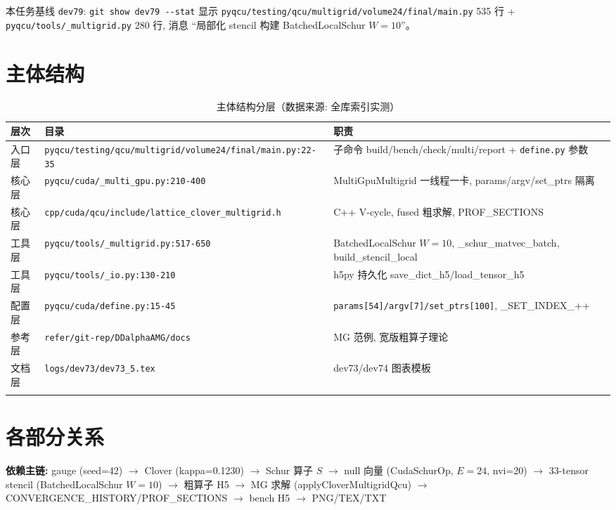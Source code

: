 \documentclass[UTF8]{ctexart}
\begin{document}
\noindent 本任务基线 \texttt{\nolinkurl{dev79}}: \texttt{\nolinkurl{git show dev79 --stat}} 显示 \texttt{\nolinkurl{pyqcu/testing/qcu/multigrid/volume24/final/main.py}} 535 行 + \texttt{\nolinkurl{pyqcu/tools/_multigrid.py}} 280 行, 消息 ``局部化 stencil 构建 BatchedLocalSchur $W=10$''。

\section{主体结构}
\begin{xltabular}{\textwidth}{llX}
\toprule
\textcolor{struct}{层次} & 目录 & \textcolor{struct}{职责} \\
\midrule
\endhead
入口层 & \texttt{\nolinkurl{pyqcu/testing/qcu/multigrid/volume24/final/main.py:22-35}} & 子命令 build/bench/check/multi/report + \texttt{\nolinkurl{define.py}} 参数 \\
核心层 & \texttt{\nolinkurl{pyqcu/cuda/_multi_gpu.py:210-400}} & MultiGpuMultigrid 一线程一卡, params/argv/set\_ptrs 隔离 \\
核心层 & \texttt{\nolinkurl{cpp/cuda/qcu/include/lattice_clover_multigrid.h}} & C++ V-cycle, fused 粗求解, PROF\_SECTIONS \\
工具层 & \texttt{\nolinkurl{pyqcu/tools/_multigrid.py:517-650}} & BatchedLocalSchur $W=10$, \_schur\_matvec\_batch, build\_stencil\_local \\
工具层 & \texttt{\nolinkurl{pyqcu/tools/_io.py:130-210}} & h5py 持久化 save\_dict\_h5/load\_tensor\_h5 \\
配置层 & \texttt{\nolinkurl{pyqcu/cuda/define.py:15-45}} & \texttt{\nolinkurl{params[54]/argv[7]/set_ptrs[100]}}, \_SET\_INDEX\_++ \\
参考层 & \texttt{\nolinkurl{refer/git-rep/DDalphaAMG/docs}} & MG 范例, 宽版粗算子理论 \\
文档层 & \texttt{\nolinkurl{logs/dev73/dev73_5.tex}} & dev73/dev74 图表模板 \\
\bottomrule
\caption{主体结构分层（数据来源: 全库索引实测）}
\end{xltabular}

\section{各部分关系}
\begin{keybox}
\textbf{依赖主链:} \textcolor{relation}{gauge (seed=42) $\to$ Clover (kappa=0.1230) $\to$ Schur 算子 $S$ $\to$ null 向量 (CudaSchurOp, $E=24$, nvi=20) $\to$ 33-tensor stencil (BatchedLocalSchur $W=10$) $\to$ 粗算子 H5 $\to$ MG 求解 (applyCloverMultigridQcu) $\to$ CONVERGENCE\_HISTORY/PROF\_SECTIONS $\to$ bench H5 $\to$ PNG/TEX/TXT}
\end{keybox}
\end{document}
